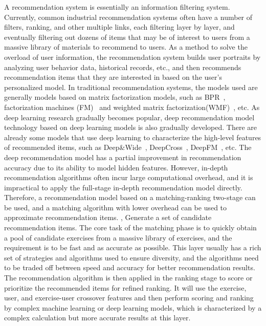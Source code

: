A recommendation system is essentially an information filtering system. Currently, common industrial recommendation systems often have a number of filters, ranking, and other multiple links, each filtering layer by layer, and eventually filtering out dozens of items that may be of interest to users from a massive library of materials to recommend to users. As a method to solve the overload of user information, the recommendation system builds user portraits by analyzing user behavior data, historical records, etc., and then recommends recommendation items that they are interested in based on the user's personalized model. In traditional recommendation systems, the models used are generally models based on matrix factorization models, such as BPR~\cite{rendle2012bpr}, factorization machines (FM)~\cite{koren2008factorization} and weighted matrix factorization(WMF)~\cite{hu2008collaborative}, etc. As deep learning research gradually becomes popular, deep recommendation model technology based on deep learning models is also gradually developed. There are already some models that use deep learning to characterize the high-level features of recommended items, such as Deep\&Wide~\cite{cheng2016wide}, DeepCross~\cite{shan2016deep}, DeepFM~\cite{guo2017deepfm}, etc. The deep recommendation model has a partial improvement in recommendation accuracy due to its ability to model hidden features. However, in-depth recommendation algorithms often incur large computational overhead, and it is impractical to apply the full-stage in-depth recommendation model directly. Therefore, a recommendation model based on a matching-ranking two-stage can be used, and a matching algorithm with lower overhead can be used to approximate recommendation items. , Generate a set of candidate recommendation items. The core task of the matching phase is to quickly obtain a pool of candidate exercises from a massive library of exercises, and the requirement is to be fast and as accurate as possible. This layer usually has a rich set of strategies and algorithms used to ensure diversity, and the algorithms need to be traded off between speed and accuracy for better recommendation results. The recommendation algorithm is then applied in the ranking stage to score or prioritize the recommended items for refined ranking. It will use the exercise, user, and exercise-user crossover features and then perform scoring and ranking by complex machine learning or deep learning models, which is characterized by a complex calculation but more accurate results at this layer.

